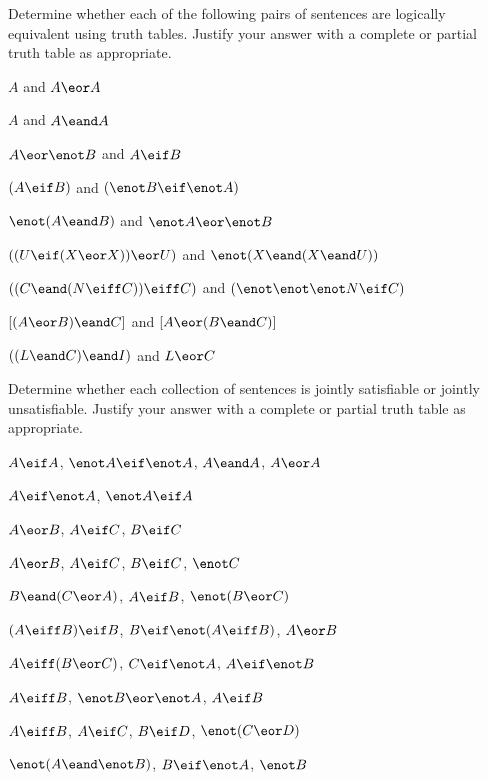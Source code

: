 \noindent\problempart
Determine whether each of the following pairs of sentences are logically equivalent using truth tables. Justify your answer with a complete or partial truth table as appropriate.
\begin{compactlist}
\item $A$ and $A \eor A$
\item $A$ and $A \eand A$
\item $A \eor \enot B$ and $A\eif B$
\item $(A \eif B)$ and $(\enot B \eif \enot A)$
\item $\enot(A \eand B)$ and $\enot A \eor \enot B$
\item $ ((U \eif (X \eor X)) \eor U)$ and $\enot (X \eand (X \eand U))$
\item $ ((C \eand (N \eiff C)) \eiff C)$ and $(\enot \enot \enot N \eif C)$
\item $[(A \eor B) \eand C]$ and $[A \eor (B \eand C)]$
\item $((L \eand C) \eand I)$ and $L \eor C$
\end{compactlist}


\noindent\problempart
\label{pr.TT.satisfiable5}
Determine whether each collection of sentences is jointly satisfiable or jointly unsatisfiable. Justify your answer with a complete or partial truth table as appropriate.
\begin{compactlist}
\item $A\eif A$, $\enot A \eif \enot A$, $A\eand A$, $A\eor A$ \vspace{.5ex} \hfill {}
\item $A \eif \enot A$, $\enot A \eif A$\vspace{.5ex} \hfill {}
\item $A\eor B$, $A\eif C$, $B\eif C$\vspace{.5ex} \hfill {}
\item $A \eor B$, $A \eif C$, $B \eif C$, $\enot C$\vspace{.5ex} \hfill {}
\item $B\eand(C\eor A)$, $A\eif B$, $\enot(B\eor C)$\vspace{.5ex}  \hfill {}
\item $(A \eiff B) \eif B$,  $B \eif \enot (A \eiff B)$, $A \eor B$ \vspace{.5ex} \hfill {}
\item $A\eiff(B\eor C)$, $C\eif \enot A$, $A\eif \enot B$\vspace{.5ex} \hfill {}
\item  $A \eiff B$,  $\enot B \eor \enot A$,  $A \eif  B$ \vspace{.5ex} \hfill {}
\item $A \eiff B$, $A \eif C$, $B \eif D$, $\enot(C \eor D)$\vspace{.5ex} \hfill {}
\item $\enot (A \eand \enot B)$,  $B \eif \enot A$, $\enot B$  \vspace{.5ex} \hfill {}
\end{compactlist}

